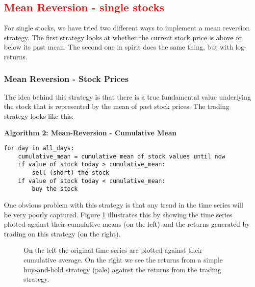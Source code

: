 \subsection{\textcolor{red}{Mean Reversion - single stocks}}
For single stocks, we have tried two different ways to implement a mean reversion strategy. The first strategy looks at whether the current stock price is above or below its past mean. The second one in spirit does the same thing, but with log-returns. 

\subsubsection{Mean Reversion - Stock Prices}
The idea behind this strategy is that there is a true fundamental value underlying the stock that is represented by the mean of past stock prices. The trading strategy looks like this: 

\vspace{2ex}
\textbf{\small{Algorithm 2: Mean-Reversion - Cumulative Mean}}
\vspace{-1ex}
\begin{verbatim}
for day in all_days: 
    cumulative_mean = cumulative mean of stock values until now
    if value of stock today > cumulative_mean:
        sell (short) the stock
    if value of stock today < cumulative_mean:
        buy the stock
\end{verbatim}

One obvious problem with this strategy is that any trend in the time series will be very poorly captured. Figure \ref{fig:mean_reversion_cum_mean} illustrates this by showing the time series plotted against their cumulative means (on the left) and the returns generated by trading on this strategy (on the right). 
\begin{figure}[h!]
    \centering
    \begin{minipage}[b]{0.49\textwidth}
        \centering
            \begin{adjustbox}{width=\textwidth,center, scale={1}{0.9}}
                
            \end{adjustbox}
    \end{minipage}
    \hfill
    \begin{minipage}[b]{0.49\textwidth}
        \centering
        \begin{adjustbox}{width=\textwidth,center, scale={1}{1.2}}
            
        \end{adjustbox}
    \end{minipage}
    \caption{On the left the original time series are plotted against their cumulative average. On the right we see the returns from a simple buy-and-hold strategy (pale) against the returns from the trading strategy.}
    \label{fig:mean_reversion_cum_mean}
\end{figure}{}

